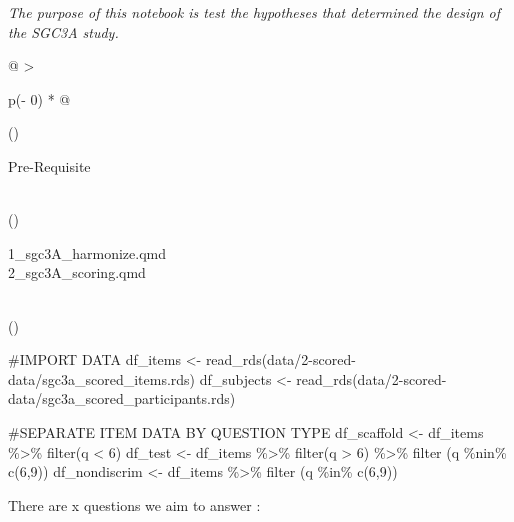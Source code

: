 \documentclass[
  letterpaper,
  DIV=11,
  numbers=noendperiod]{scrreprt}
\newenvironment{Shaded}{\begin{snugshade}}{\end{snugshade}}
\newcommand{\CommentTok}[1]{\textcolor[rgb]{0.37,0.37,0.37}{#1}}
\newcommand{\DecValTok}[1]{\textcolor[rgb]{0.68,0.00,0.00}{#1}}
\newcommand{\FunctionTok}[1]{\textcolor[rgb]{0.28,0.35,0.67}{#1}}
\newcommand{\NormalTok}[1]{\textcolor[rgb]{0.00,0.23,0.31}{#1}}
\newcommand{\OtherTok}[1]{\textcolor[rgb]{0.00,0.23,0.31}{#1}}
\newcommand{\SpecialCharTok}[1]{\textcolor[rgb]{0.37,0.37,0.37}{#1}}
\newcommand{\StringTok}[1]{\textcolor[rgb]{0.13,0.47,0.30}{#1}}
\begin{document}
\emph{The purpose of this notebook is test the hypotheses that
determined the design of the SGC3A study.}

\begin{longtable}[]{@{}
  >{\raggedright\arraybackslash}p{(\columnwidth - 0\tabcolsep) * }@{}}
\toprule()
\begin{minipage}[b]{\linewidth}\raggedright
Pre-Requisite
\end{minipage} \\
\midrule()
\endhead
\begin{minipage}[t]{\linewidth}\raggedright
1\_sgc3A\_harmonize.qmd\\
2\_sgc3A\_scoring.qmd\strut
\end{minipage} \\
\bottomrule()
\end{longtable}

\begin{Shaded}
\begin{Highlighting}[]
\CommentTok{\#IMPORT DATA }
\NormalTok{df\_items }\OtherTok{\textless{}{-}} \FunctionTok{read\_rds}\NormalTok{(}\StringTok{\textquotesingle{}data/2{-}scored{-}data/sgc3a\_scored\_items.rds\textquotesingle{}}\NormalTok{)}
\NormalTok{df\_subjects }\OtherTok{\textless{}{-}} \FunctionTok{read\_rds}\NormalTok{(}\StringTok{\textquotesingle{}data/2{-}scored{-}data/sgc3a\_scored\_participants.rds\textquotesingle{}}\NormalTok{)}


\CommentTok{\#SEPARATE ITEM DATA BY QUESTION TYPE}
\NormalTok{df\_scaffold }\OtherTok{\textless{}{-}}\NormalTok{ df\_items }\SpecialCharTok{\%\textgreater{}\%} \FunctionTok{filter}\NormalTok{(q }\SpecialCharTok{\textless{}} \DecValTok{6}\NormalTok{)}
\NormalTok{df\_test }\OtherTok{\textless{}{-}}\NormalTok{ df\_items }\SpecialCharTok{\%\textgreater{}\%} \FunctionTok{filter}\NormalTok{(q }\SpecialCharTok{\textgreater{}} \DecValTok{6}\NormalTok{) }\SpecialCharTok{\%\textgreater{}\%} \FunctionTok{filter}\NormalTok{ (q }\SpecialCharTok{\%nin\%} \FunctionTok{c}\NormalTok{(}\DecValTok{6}\NormalTok{,}\DecValTok{9}\NormalTok{))}
\NormalTok{df\_nondiscrim }\OtherTok{\textless{}{-}}\NormalTok{ df\_items }\SpecialCharTok{\%\textgreater{}\%} \FunctionTok{filter}\NormalTok{ (q }\SpecialCharTok{\%in\%} \FunctionTok{c}\NormalTok{(}\DecValTok{6}\NormalTok{,}\DecValTok{9}\NormalTok{))}
\end{Highlighting}
\end{Shaded}

There are x questions we aim to answer :
\end{document}

